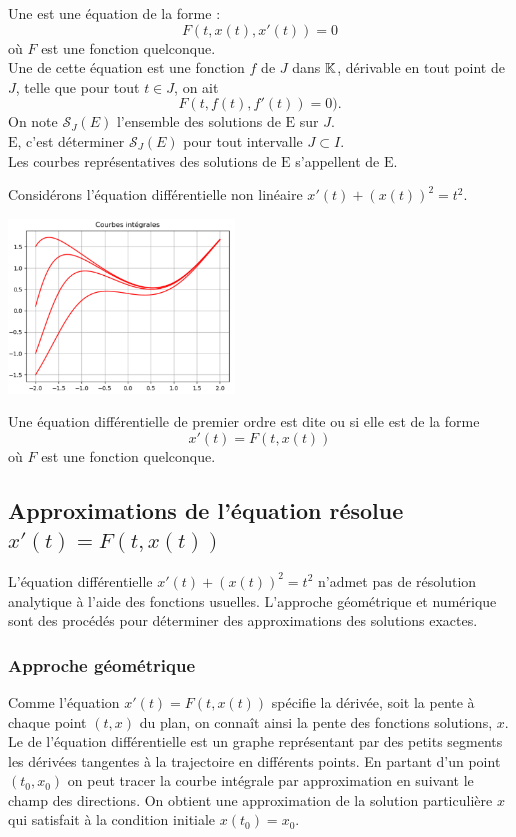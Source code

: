 \documentclass{book}
\begin{document}
\begin{Definition} Une  est une équation de la forme : 
$$F(t,x(t),x'(t))=0$$ où $F$ est une fonction quelconque.\\
Une  de cette équation est une fonction $f$ de $J$ dans $\mathbb{K}$,
dérivable en tout point de $J$, telle que pour tout $t\in J$, on ait
\[F(t,f(t),f'(t)) = 0).\]
On note $\mathcal{S}_J(E)$ l'ensemble des solutions de $\mathrm{E}$ sur $J$.\\
 $\mathrm{E}$, c'est déterminer $\mathcal{S}_J(E)$
pour tout intervalle $J\subset I$.\\
Les courbes représentatives des solutions de $\mathrm{E}$ s'appellent  de $\mathrm{E}$.
\end{Definition}
\begin{Exemple}Considérons l'équation différentielle non linéaire $x'(t)+(x(t))^2=t^2.$ 
\begin{center}
\includegraphics[width=6cm]{C7_equation_differentielle_unresolded.png}
\end{center}
\end{Exemple}
%
\begin{Definition}[Normalisée]  Une équation différentielle de premier ordre est  dite  ou 
  si elle est de la forme  $$x'(t) =F(t,x(t))$$
où $F$ est une fonction quelconque.
\end{Definition}
\subsection{Approximations de l'équation résolue $x'(t)=F(t,x(t))$ }
L'équation différentielle $ x'(t)+(x(t))^2=t^2$ n'admet pas de résolution analytique à l'aide des fonctions usuelles. L'approche géométrique et numérique sont des procédés pour déterminer des approximations des solutions exactes. 
 
\subsubsection{Approche géométrique}
Comme l'équation $x'(t) = F(t,x(t))$ spécifie la dérivée, soit la pente à chaque point $(t,x)$ du plan, on connaît ainsi la pente des fonctions solutions, $x$. Le  de l'équation différentielle est un graphe  représentant par des petits segments  les dérivées tangentes à la trajectoire en différents points. En partant d'un point $(t_0,x_0)$ on peut tracer la courbe intégrale par approximation en suivant le champ des directions. On obtient une approximation de la solution particulière $x$ qui satisfait à la condition initiale $x(t_0)=x_0$.
\end{document}
